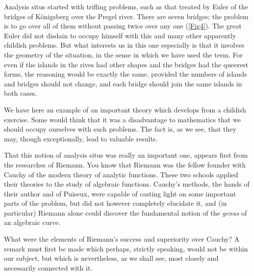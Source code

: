 \documentclass[12pt,oneside]{book}
\begin{document}
Analysis situs started with trifling problems, such as that treated by Euler of
the bridges of K\"onigsberg over the Pregel river. There are seven bridges; the
problem is to go over all of them without passing twice over any one
(\ref{Fig4}). The great Euler did not disdain to occupy himself with this and
many other apparently childish problems. But what interests us in this one
especially is that it involves the geometry of the situation, in the sense in
which we have used the term. For even if the islands in the rives had other
shapes and the bridges had the queerest forms, the reasoning would be exactly
the same, provided the numbers of islands and bridges should not change, and
each bridge should join the same islands in both cases. \par

We have here an example of an important theory which develops from a childish
exercise. Some would think that it was a disadvantage to mathematics that we
should occupy ourselves with such problems. The fact is, as we see, that they
may, though exceptionally, lead to valuable results. \par

That this notion of analysis situs was really an important one, appears first
from the researches of Riemann. You know that Riemann was the fellow founder
with Cauchy of the modern theory of analytic functions. These two schools
applied their theories to the study of algebraic functions. Cauchy's methods,
the hands of their author and of Puiseux, were capable of casting light on
some important parts of the problem, but did not however completely elucidate
it, and (in particular) Riemann alone could discover the fundamental notion of
the \textit{genus} of an algebraic curve. \par

What were the elements of Riemann's success and superiority over Cauchy? A
remark must first be made which perhaps, strictly speaking, would not be within
our subject, but which is nevertheless, as we shall see, most closely and
necessarily connected with it. \par
\end{document}
